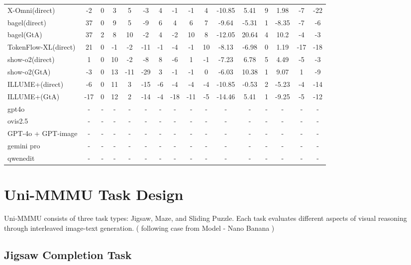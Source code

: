 \documentclass{article}
\theoremstyle{plain}
\theoremstyle{definition}
\theoremstyle{remark}
\begin{document}
\begin{table}[!htbp]
{\begin{tabular}{@{}lccccccccccccccc@{}}
X-Omni(direct) & -2 & 0 & 3 & 5 & -3 & 4 & -1 & -1 & 4 & -10.85 & 5.41 & 9 & 1.98 & -7 & -22 \\
bagel(direct) & 37 & 0 & 9 & 5 & -9 & 6 & 4 & 6 & 7 & -9.64 & -5.31 & 1 & -8.35 & -7 & -6 \\
bagel(GtA) & 37 & 2 & 8 & 10 & -2 & 4 & -2 & 10 & 8 & -12.05 & 20.64 & 4 & 10.2 & -4 & -3 \\
TokenFlow-XL(direct) & 21 & 0 & -1 & -2 & -11 & -1 & -4 & -1 & 10 & -8.13 & -6.98 & 0 & 1.19 & -17 & -18 \\
show-o2(direct) & 1 & 0 & 10 & -2 & -8 & 8 & -6 & 1 & -1 & -7.23 & 6.78 & 5 & 4.49 & -5 & -3 \\
show-o2(GtA) & -3 & 0 & 13 & -11 & -29 & 3 & -1 & -1 & 0 & -6.03 & 10.38 & 1 & 9.07 & 1 & -9 \\
ILLUME+(direct) & -6 & 0 & 11 & 3 & -15 & -6 & -4 & -4 & -4 & -10.85 & -0.53 & 2 & -5.23 & -4 & -14 \\
ILLUME+(GtA) & -17 & 0 & 12 & 2 & -14 & -4 & -18 & -11 & -5 & -14.46 & 5.41 & 1 & -9.25 & -5 & -12 \\
\midrule
\rowcolor{orange!8}
gpt4o & - & - & - & - & - & - & - & - & - & - & - & - & - & - & - \\
ovis2.5 & - & - & - & - &- & - & - & - & - & - & - & - & - & - & - \\
\midrule
GPT-4o + GPT-image & - & - & - & - & - & - & - & - & - & - & - & - & - & - & - \\
gemini pro & - & - & - & - & - & - & - & - & - & - & - & - & - & - & - \\
qwenedit & - & - & - & - & - & - & - & - & - & - & - & - & - & - & - \\
\bottomrule
\end{tabular}%
}
\end{table}


\section{Uni-MMMU Task Design}
\label{app:uni-mmmu}

Uni-MMMU consists of three task types: Jigsaw, Maze, and Sliding Puzzle. Each task evaluates different aspects of visual reasoning through interleaved image-text generation. ( following case from Model - Nano Banana )

\subsection{Jigsaw Completion Task}
\end{document}
